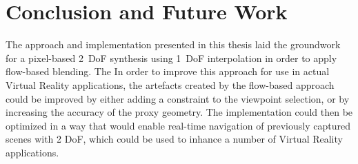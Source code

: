 \chapter{Conclusion and Future Work}

The approach and implementation presented in this thesis laid the groundwork for a pixel-based 2~DoF synthesis using 1~DoF interpolation in order to apply flow-based blending. The 
In order to improve this approach for use in actual Virtual Reality applications, the artefacts created by the flow-based approach could be improved by either adding a constraint to the viewpoint selection, or by increasing the accuracy of the proxy geometry. The implementation could then be optimized in a way that would enable real-time navigation of previously captured scenes with 2 DoF, which could be used to inhance a number of Virtual Reality applications.



